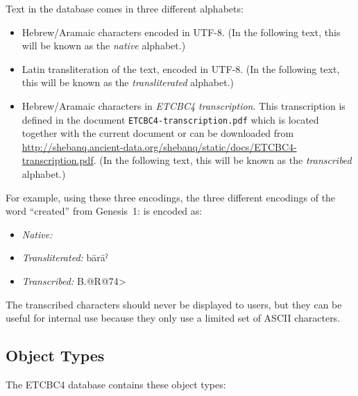\documentclass[11pt,oneside,a4paper]{memoir}
\newcommand*{\bibleref}[3]{#1~#2\thinspace:\thinspace#3}
\newcommand{\heb}[1]{{\RL {\ezr #1}}}
\begin{document}
Text in the database comes in three different alphabets:

\begin{itemize}

\item Hebrew/Aramaic characters encoded in UTF-8. (In the following
  text, this will be known as the \emph{native} alphabet.)%

\item Latin transliteration of the text, encoded in UTF-8. (In the
  following text, this will be known as the \emph{transliterated} alphabet.)%

\item Hebrew/Aramaic characters in \emph{ETCBC4 transcription}.%
  \label{page-transcribed}
  This transcription is defined in the document \texttt{ETCBC4-transcription.pdf} which is located
  together with the current document or can be downloaded from
  \url{http://shebanq.ancient-data.org/shebanq/static/docs/ETCBC4-transcription.pdf}. (In the
  following text, this will be known as the \emph{transcribed} alphabet.)

\end{itemize}

For example, using these three encodings, the three different encodings of the word ``created'' from
\bibleref{Genesis}{1}{1} is encoded as:

\begin{itemize}
\item \emph{Native:} \heb{בָּרָ֣א}
\item \emph{Transliterated:} bārāˀ
\item \emph{Transcribed:} B.@R@74>
\end{itemize}

The transcribed characters should never be displayed to users, but they can be useful for internal
use because they only use a limited set of ASCII characters.


\subsection{Object Types}

The ETCBC4 database contains these object types:
\end{document}
